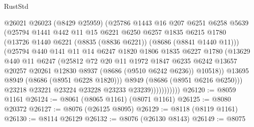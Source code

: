 \begin{lexlean}{RustStd}
\begin{coremodule}
                        @26021
                        @26023
                        (@8429 @25959)
                        (@25786
                          @1443
                          @16
                          @207
                          @6251
                          @6258
                          @5639
                          (@25794
                            @1441
                            @442
                            @11
                            @15
                            @6221
                            @6250
                            @6257
                            @1835
                            @6215
                            @1780
                            (@13726 @1440 @6221 (@8835 (@8836 @6221)) (@8686 (@8841 @1440 @11)))
                            (@25794
                              @440
                              @141
                              @11
                              @14
                              @6247
                              @1820
                              @1806
                              @1835
                              @6227
                              @1780
                              (@13629
                                @440
                                @11
                                @6247
                                (@25812
                                  @72
                                  @20
                                  @11
                                  @1972
                                  @1847
                                  @6235
                                  @6242
                                  @13657
                                  @20257
                                  @20261
                                  @12830
                                  @8937
                                  (@8686 (@9510 @6242 @6236))
                                  @10518))
                              @13695
                              @8949
                              (@8686 (@8951 @6228 @1820)))
                            @8949
                            (@8686 (@8951 @6216 @6250)))
                          @23218
                          @23221
                          @23224
                          @23228
                          @23233
                          @23239)))))))))))
@26120 := @8059 @1161
@26124 := @8061 (@8065 @1161) (@8071 @1161)
@26125 := @8080 @20372
@26127 := @8076 (@26125 @8095)
@26129 := @8118 (@8119 @1161)
@26130 := @8114 @26129
@26132 := @8076 (@26130 @8143)
@26149 := @8075

\end{coremodule}
\end{lexlean}
